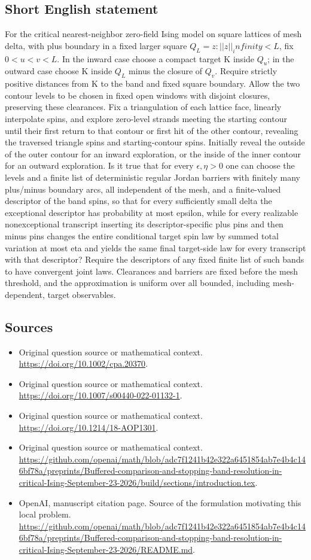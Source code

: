 \documentclass[11pt]{article}
\begin{document}
\subsection{Short English statement}
For the critical nearest-neighbor zero-field Ising model on square lattices of mesh delta, with plus boundary in a fixed larger square $Q_L={z:||z||_infinity<L}$, fix $0<u<v<L$. In the inward case choose a compact target K inside $Q_u$; in the outward case choose K inside $Q_L$ minus the closure of $Q_v$. Require strictly positive distances from K to the band and fixed square boundary. Allow the two contour levels to be chosen in fixed open windows with disjoint closures, preserving these clearances. Fix a triangulation of each lattice face, linearly interpolate spins, and explore zero-level strands meeting the starting contour until their first return to that contour or first hit of the other contour, revealing the traversed triangle spins and starting-contour spins. Initially reveal the outside of the outer contour for an inward exploration, or the inside of the inner contour for an outward exploration. Is it true that for every $\epsilon ,\eta >0$ one can choose the levels and a finite list of deterministic regular Jordan barriers with finitely many plus/minus boundary arcs, all independent of the mesh, and a finite-valued descriptor of the band spins, so that for every sufficiently small delta the exceptional descriptor has probability at most epsilon, while for every realizable nonexceptional transcript inserting its descriptor-specific plus pins and then minus pins changes the entire conditional target spin law by summed total variation at most eta and yields the same final target-side law for every transcript with that descriptor? Require the descriptors of any fixed finite list of such bands to have convergent joint laws. Clearances and barriers are fixed before the mesh threshold, and the approximation is uniform over all bounded, including mesh-dependent, target observables.
\subsection{Sources}
\begin{itemize}
\item[S1] Original question source or mathematical context.
\url{https://doi.org/10.1002/cpa.20370}.
\item[S2] Original question source or mathematical context.
\url{https://doi.org/10.1007/s00440-022-01132-1}.
\item[S3] Original question source or mathematical context.
\url{https://doi.org/10.1214/18-AOP1301}.
\item[S4] Original question source or mathematical context.
\url{https://github.com/openai/math/blob/adc7f1241b42e322a6451854ab7e4b4c146bf78a/preprints/Buffered-comparison-and-stopping-band-resolution-in-critical-Ising-September-23-2026/build/sections/introduction.tex}.
\item[S5] OpenAI, manuscript citation page. Source of the formulation motivating this local problem.
\url{https://github.com/openai/math/blob/adc7f1241b42e322a6451854ab7e4b4c146bf78a/preprints/Buffered-comparison-and-stopping-band-resolution-in-critical-Ising-September-23-2026/README.md}.
\end{itemize}
\end{document}
